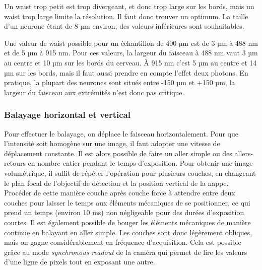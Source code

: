
Un waist trop petit est trop divergeant, et donc trop large sur les bords, mais un waist trop large limite la résolution. Il faut donc trouver un optimum. La taille d'un neurone étant de 8 µm environ, des valeurs inférieures sont souhaitables.

Une valeur de waist possible pour un échantillon de 400 µm est de 3 µm à 488 nm et de 5 µm à 915 nm. Pour ces valeurs, la largeur du faisceau à 488 nm vaut 3 µm au centre et 10 µm sur les bords du cerveau. À 915 nm c'est 5 µm au centre et 14 µm sur les bords, mais il faut aussi prendre en compte l'effet deux photons. En pratique, la plupart des neurones sont situés entre -150 µm et +150 µm, la largeur du faisceau aux extrémités n'est donc pas critique.

\subsubsection{Balayage horizontal et vertical}

Pour effectuer le balayage, on déplace le faisceau horizontalement. Pour que l'intensité soit homogène sur une image, il faut adopter une vitesse de déplacement constante. Il est alors possible de faire un aller simple ou des allers-retours en nombre entier pendant le temps d'exposition. Pour obtenir une image volumétrique, il suffit de répéter l'opération pour plusieurs couches, en changeant le plan focal de l'objectif de détection et la position vertical de la nappe. Procéder de cette manière couche après couche force à attendre entre deux couches pour laisser le temps aux éléments mécaniques de se positionner, ce qui prend un temps (environ 10 ms) non négligeable pour des durées d'exposition courtes. Il est également possible de bouger les éléments mécaniques de manière continue en balayant en aller simple. Les couches sont donc légèrement obliques, mais on gagne considérablement en fréquence d'acquisition. Cela est possible grâce au mode \emph{synchronous readout} de la caméra qui permet de lire les valeurs d'une ligne de pixels tout en exposant une autre.



